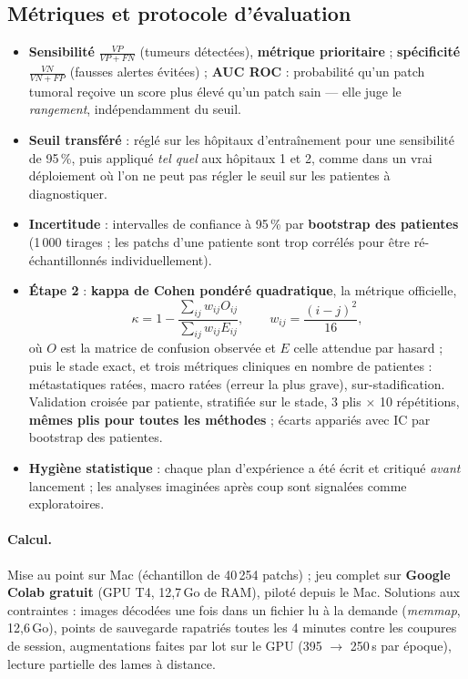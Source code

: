 \documentclass[11pt,a4paper]{article}
\begin{document}
\subsection{Métriques et protocole d'évaluation}
\begin{itemize}
  \item \textbf{Sensibilité} $\frac{VP}{VP+FN}$ (tumeurs détectées), \textbf{métrique prioritaire} ; \textbf{spécificité}
        $\frac{VN}{VN+FP}$ (fausses alertes évitées) ; \textbf{AUC ROC} : probabilité qu'un patch tumoral reçoive un score plus élevé
        qu'un patch sain — elle juge le \emph{rangement}, indépendamment du seuil.
  \item \textbf{Seuil transféré} : réglé sur les hôpitaux d'entraînement pour une sensibilité de 95\,\%, puis appliqué \emph{tel quel}
        aux hôpitaux 1 et 2, comme dans un vrai déploiement où l'on ne peut pas régler le seuil sur les patientes à diagnostiquer.
  \item \textbf{Incertitude} : intervalles de confiance à 95\,\% par \textbf{bootstrap des patientes} (1\,000 tirages ; les patchs
        d'une patiente sont trop corrélés pour être ré-échantillonnés individuellement).
  \item \textbf{Étape 2} : \textbf{kappa de Cohen pondéré quadratique}, la métrique officielle,
        \[ \kappa=1-\frac{\sum_{ij} w_{ij}O_{ij}}{\sum_{ij} w_{ij}E_{ij}}, \qquad w_{ij}=\frac{(i-j)^2}{16}, \]
        où $O$ est la matrice de confusion observée et $E$ celle attendue par hasard ; puis le stade exact, et trois métriques cliniques en nombre de
        patientes : métastatiques ratées, macro ratées (erreur la plus grave), sur-stadification. Validation croisée par patiente,
        stratifiée sur le stade, 3 plis $\times$ 10 répétitions, \textbf{mêmes plis pour toutes les méthodes} ; écarts appariés avec
        IC par bootstrap des patientes.
  \item \textbf{Hygiène statistique} : chaque plan d'expérience a été écrit et critiqué \emph{avant} lancement ; les analyses imaginées
        après coup sont signalées comme exploratoires.
\end{itemize}

\paragraph{Calcul.} Mise au point sur Mac (échantillon de 40\,254 patchs) ; jeu complet sur \textbf{Google Colab gratuit} (GPU T4,
12,7\,Go de RAM), piloté depuis le Mac. Solutions aux contraintes : images décodées une fois dans un fichier lu à la demande
(\emph{memmap}, 12,6\,Go), points de sauvegarde rapatriés toutes les 4 minutes contre les coupures de session, augmentations faites
par lot sur le GPU (395 $\to$ 250\,s par époque), lecture partielle des lames à distance.
\end{document}
